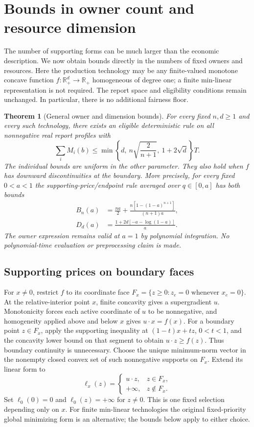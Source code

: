 \documentclass[11pt]{article}
\newtheorem{theorem}{Theorem}[section]
\theoremstyle{definition}\newtheorem{definition}[theorem]{Definition}
\theoremstyle{remark}\newtheorem{remark}[theorem]{Remark}
\newcommand{\R}{\mathbb R}
\begin{document}
\section{Bounds in owner count and resource dimension}\label{general:section}
The number of supporting forms can be much larger than the economic description.
We now obtain bounds directly in the numbers of fixed owners and resources.
Here the production technology may be any finite-valued monotone concave
function $f:\R_+^d\to\R_+$ homogeneous of degree one; a finite min-linear
representation is not required. The report space and eligibility conditions
remain unchanged. In particular, there is no additional fairness floor.

\begin{theorem}[General owner and dimension bounds]\label{general:sqrt}
For every fixed $n,d\ge1$ and every such technology, there exists an eligible
deterministic rule on all nonnegative real report profiles with
\begin{equation}\label{general:combined}
 \sum_i M_i(b)\le
 \min\left\{d,\ n\sqrt{\frac{2}{n+1}},\ 1+2\sqrt d\right\}T.
\end{equation}
The individual bounds are uniform in the other parameter. They also hold when
$f$ has downward discontinuities at the boundary. More precisely, for every
fixed $0<a<1$ the supporting-price/endpoint rule averaged over $q\in[0,a]$
has both bounds
\begin{align}
 B_n(a)&=\frac{na}{2}+
 \frac{n[1-(1-a)^{n+1}]}{(n+1)a},\label{general:owner}\\
 D_d(a)&=\frac{1+2d[-a-\log(1-a)]}{a}.\label{general:dimension}
\end{align}
The owner expression remains valid at $a=1$ by polynomial integration.
No polynomial-time evaluation or preprocessing claim is made.
\end{theorem}

\subsection{Supporting prices on boundary faces}
For $x\ne0$, restrict $f$ to its coordinate face
$F_x=\{z\ge0:z_e=0\text{ whenever }x_e=0\}$.
At the relative-interior point $x$, finite concavity gives a supergradient $u$.
Monotonicity forces each active coordinate of $u$ to be nonnegative, and
homogeneity applied above and below $x$ gives $u\cdot x=f(x)$.
For a boundary point $z\in F_x$, apply the supporting inequality at
$(1-t)x+tz$, $0<t<1$, and the concavity lower bound on that segment to obtain
$u\cdot z\ge f(z)$. Thus boundary continuity is unnecessary.
Choose the unique minimum-norm vector in the nonempty closed convex set of
such nonnegative supports on $F_x$. Extend its linear form to
\[
 \ell_x(z)=\begin{cases}u\cdot z,&z\in F_x,\\+\infty,&z\notin F_x.
 \end{cases}
\]
Set $\ell_0(0)=0$ and $\ell_0(z)=+\infty$ for $z\ne0$.
This is one fixed selection depending only on $x$. For finite min-linear
technologies the original fixed-priority global minimizing form is an
alternative; the bounds below apply to either choice.
\end{document}
